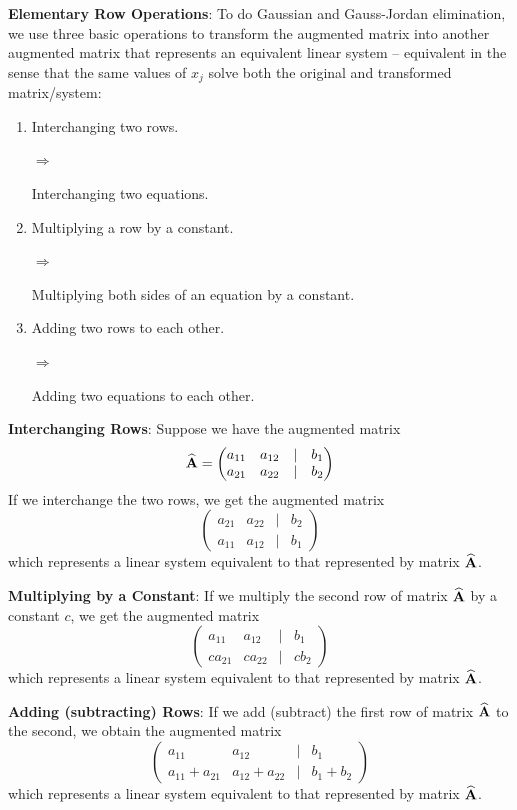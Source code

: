\documentclass[]{book}
\theoremstyle{definition}
\theoremstyle{definition}
\theoremstyle{definition}
\theoremstyle{remark}
\begin{document}
\textbf{Elementary Row Operations}: To do Gaussian and Gauss-Jordan
elimination, we use three basic operations to transform the augmented
matrix into another augmented matrix that represents an equivalent
linear system -- equivalent in the sense that the same values of \(x_j\)
solve both the original and transformed matrix/system:

\begin{enumerate}
        \item \parbox[t]{2.5in}{Interchanging two rows.}$\Longrightarrow\qquad$ \parbox[t]{2.5in}{Interchanging two equations.}
        \item \parbox[t]{2.5in}{Multiplying a row by a constant.}$\Longrightarrow\qquad$ \parbox[t]{2.5in}{Multiplying both sides of an equation by a constant.}
        \item \parbox[t]{2.5in}{Adding two rows to each other.}$\Longrightarrow\qquad$ \parbox[t]{2.5in}{Adding two equations to each other.}
    \end{enumerate}

\textbf{Interchanging Rows}: Suppose we have the augmented matrix
\[{\widehat{\bf A}}=\begin{pmatrix} a_{11} & a_{12} & | & b_1\\
            a_{21} & a_{22} & | & b_2 
            \end{pmatrix}\] If we interchange the two rows, we get the
augmented matrix \[\begin{pmatrix}
            a_{21} & a_{22} & | & b_2\\
            a_{11} & a_{12} & | & b_1
            \end{pmatrix}\] which represents a linear system equivalent
to that represented by matrix \(\widehat{\bf A}\).

\textbf{Multiplying by a Constant}: If we multiply the second row of
matrix \(\widehat{\bf A}\) by a constant \(c\), we get the augmented
matrix \[\begin{pmatrix}
            a_{11} & a_{12} & | & b_1\\
            c a_{21} & c a_{22} & | & c b_2
            \end{pmatrix}\] which represents a linear system equivalent
to that represented by matrix \(\widehat{\bf A}\).

\textbf{Adding (subtracting) Rows}: If we add (subtract) the first row
of matrix \(\widehat{\bf A}\) to the second, we obtain the augmented
matrix \[\begin{pmatrix}
            a_{11} & a_{12} & | & b_1\\
            a_{11}+a_{21} & a_{12}+a_{22} & | & b_1+b_2
            \end{pmatrix}\] which represents a linear system equivalent
to that represented by matrix \(\widehat{\bf A}\).
\end{document}
